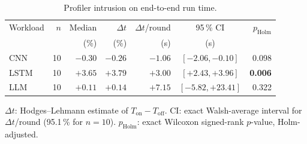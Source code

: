 \begin{table}[t]
\centering
\caption{Profiler intrusion on end-to-end run time.}
\label{tab:intrusion}
\setlength{\tabcolsep}{4pt}
\begin{tabular}{lrrrrcr}
\toprule
Workload & $n$ & Median & $\Delta t$ & $\Delta t$/round & 95\,\% CI & $p_\text{Holm}$ \\
         &     & (\%)   & (\%)       & (\si{\second})   & (\si{\second}) &  \\
\midrule
CNN  & 10 & $-0.30$ & $-0.26$ & $-1.06$ & $[-2.06, -0.10]$ & 0.098 \\
LSTM & 10 & $+3.65$ & $+3.79$ & $+3.00$ & $[+2.43, +3.96]$ & \textbf{0.006} \\
LLM  & 10 & $+0.11$ & $+0.14$ & $+7.15$ & $[-5.82, +23.41]$ & 0.322 \\
\bottomrule
\end{tabular}

\vspace{2pt}
{\footnotesize $\Delta t$: Hodges--Lehmann estimate of $T_\text{on}-T_\text{off}$.
CI: exact Walsh-average interval for $\Delta t$/round (95.1\,\% for $n=10$).
$p_\text{Holm}$: exact Wilcoxon signed-rank $p$-value, Holm-adjusted.}
\end{table}

